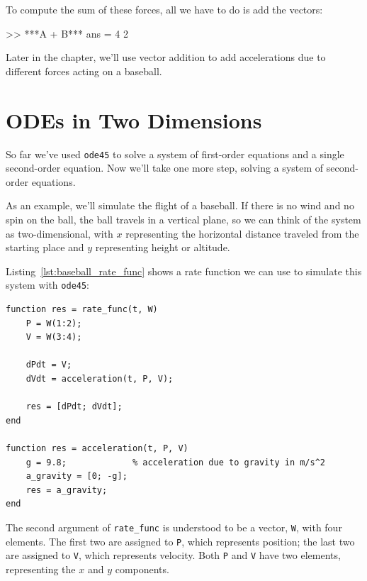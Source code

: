 To compute the sum of these forces, all we have to do is add the vectors:

\begin{code}
>> ***A + B***
ans = 4     2
\end{code}

Later in the chapter, we'll use vector addition to add accelerations due to different forces acting on a baseball.


\section{ODEs in Two Dimensions}
\label{projectile}

So far we've used \lstinline{ode45} to solve a system of first-order equations and a single second-order equation.  Now we'll take one more step, solving a system of second-order equations.

As an example, we'll simulate the flight of a baseball.
If there is no wind and no spin on the ball, the ball travels in a vertical plane, so we can think of the system as two-dimensional, with $x$ representing the horizontal distance
traveled from the starting place and $y$ representing height or altitude.


Listing~\ref{lst:baseball_rate_func} shows a rate function we can use to simulate this system with \lstinline{ode45}:

\begin{lstlisting}[caption={A rate function we can use to model the flight of a baseball}, label={lst:baseball_rate_func}]
function res = rate_func(t, W)
    P = W(1:2);
    V = W(3:4);

    dPdt = V;
    dVdt = acceleration(t, P, V);

    res = [dPdt; dVdt];
end

function res = acceleration(t, P, V)
    g = 9.8;             % acceleration due to gravity in m/s^2
    a_gravity = [0; -g];
    res = a_gravity;
end
\end{lstlisting}

The second argument of \lstinline{rate_func} is understood to be a vector,
\lstinline{W}, with four elements.  The first two are assigned to \lstinline{P},
which represents position; the last two are assigned to \lstinline{V}, which
represents velocity. Both \lstinline{P} and \lstinline{V} have two elements,
representing the $x$ and $y$ components.

